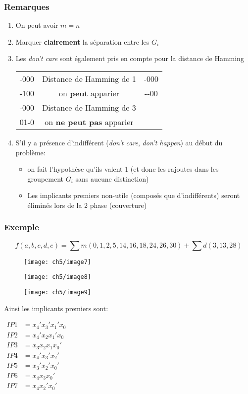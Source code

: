 \subsubsection{Remarques}
\begin{enumerate}
	\item On peut avoir $m=n$
	\item Marquer \textbf{clairement} la séparation entre les $G_i$
	\item Les \textit{don't care} sont également pris en compte pour la distance de Hamming
	\begin{table}[H]
		\centering
		\begin{tabular}{|ccc|}
			\hline
			-000 & Distance de Hamming de 1 & -000\\
			-100 & on \textbf{peut} apparier & -{}-00\\
			\hline
			-000 & Distance de Hamming de 3 & \\
			01-0 & on \textbf{ne peut pas} apparier & \\
			\hline
		\end{tabular}
	\end{table}
	\item S'il y a présence d'indifférent (\textit{don't care}, \textit{don't happen}) au début du problème:
	\begin{itemize}
		\item on fait l'hypothèse qu'ils valent 1 (et donc les rajoutes dans les groupement $G_i$ sans aucune distinction)
		\item Les implicants premiers non-utile (composés que d'indifférents) seront éliminés lors de la 2 phase (couverture)
	\end{itemize}
\end{enumerate}
\subsubsection{Exemple}
\begin{equation*}
	f(a,b,c,d,e)=\sum m(0,1,2,5,14,16,18,24,26,30)+\sum d(3,13,28)
\end{equation*}
\begin{figure}[H]
	\centering
	\texttt{[image: ch5/image7]}
\end{figure}
\begin{figure}[H]
	\centering
	\texttt{[image: ch5/image8]}
\end{figure}
\begin{figure}[H]
	\centering
	\texttt{[image: ch5/image9]}
\end{figure}
Ainsi les implicants premiers sont:
\begin{table}[H]
	\centering
	$\begin{array}{ll}
	IP1 & =x_4'x_3'x_1'x_0 \\
	IP2 & =x_4'x_2x_1'x_0\\
	IP3 & =x_3x_2x_1x_0'\\
	IP4 & =x_4'x_3'x_2'\\
	IP5 & =x_3'x_2'x_0'\\
	IP6 & =x_4x_3x_0'\\
	IP7 & =x_4x_2'x_0'\\
	\end{array}$
\end{table}
